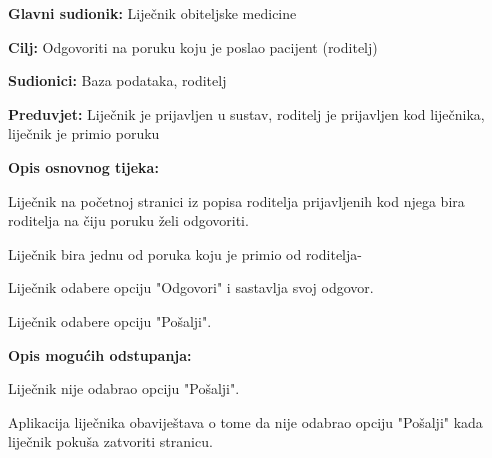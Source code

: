 					\noindent {}
					\begin{packed_item}
						
						\item \textbf{Glavni sudionik: }Liječnik obiteljske medicine
						\item  \textbf{Cilj:} Odgovoriti na poruku koju je poslao pacijent (roditelj)
						\item  \textbf{Sudionici:} Baza podataka, roditelj
						\item  \textbf{Preduvjet:} Liječnik je prijavljen u sustav, roditelj je prijavljen kod liječnika, liječnik je primio poruku
						\item  \textbf{Opis osnovnog tijeka:}
						
						\item[] \begin{packed_enum}
							
							\item Liječnik na početnoj stranici iz popisa roditelja prijavljenih kod njega bira roditelja na čiju poruku želi odgovoriti.
							\item Liječnik bira jednu od poruka koju je primio od roditelja-
							\item Liječnik odabere opciju "Odgovori" i sastavlja svoj odgovor.
							\item Liječnik odabere opciju "Pošalji".
						\end{packed_enum}
						
						\item  \textbf{Opis mogućih odstupanja:}
						
						\item[] \begin{packed_item}
							
							\item[3.a] Liječnik nije odabrao opciju "Pošalji".
							\item[] \begin{packed_enum}
								
								\item Aplikacija liječnika obaviještava o tome da nije odabrao opciju "Pošalji" kada liječnik pokuša zatvoriti stranicu.
							\end{packed_enum}
							
							
						\end{packed_item}
						
						
					\end{packed_item}
					
